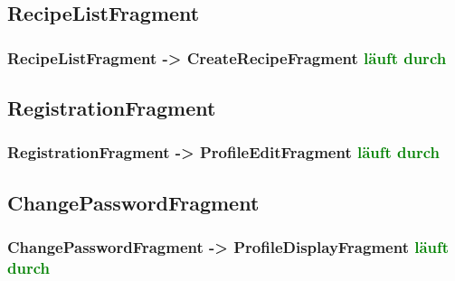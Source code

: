 \subsection{RecipeListFragment}
\subsubsection{RecipeListFragment -> CreateRecipeFragment \textcolor{green}{läuft durch}}

\subsection{RegistrationFragment}
\subsubsection{RegistrationFragment -> ProfileEditFragment \textcolor{green}{läuft durch}}

\subsection{ChangePasswordFragment}
\subsubsection{ChangePasswordFragment -> ProfileDisplayFragment \textcolor{green}{läuft durch}}



